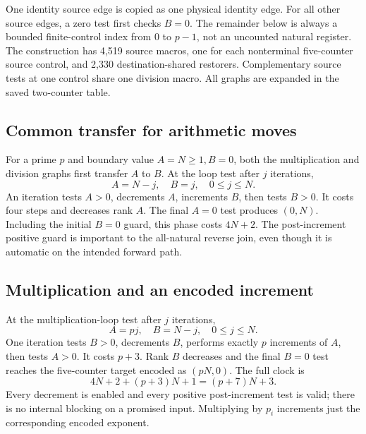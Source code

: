 \documentclass[11pt,a4paper]{article}
\numberwithin{equation}{section}
\begin{document}
One identity source edge is copied as one physical identity edge. For all
other source edges, a zero test first checks $B=0$. The remainder below is
always a bounded finite-control index from $0$ to $p-1$, not an uncounted
natural register. The construction has 4,519 source macros, one for each
nonterminal five-counter source control, and 2,330 destination-shared
restorers. Complementary source tests at one control share one division
macro. All graphs are expanded in the saved two-counter table.

\subsection{Common transfer for arithmetic moves}
For a prime $p$ and boundary value $A=N\ge1,B=0$, both the multiplication
and division graphs first transfer $A$ to $B$. At the loop test after $j$
iterations,
\[
                       A=N-j,\quad B=j,\quad0\le j\le N.\tag{13}
\]
An iteration tests $A>0$, decrements $A$, increments $B$, then tests $B>0$.
It costs four steps and decreases rank $A$. The final $A=0$ test produces
$(0,N)$. Including the initial $B=0$ guard, this phase costs $4N+2$.
The post-increment positive guard is important to the all-natural reverse
join, even though it is automatic on the intended forward path.

\subsection{Multiplication and an encoded increment}
At the multiplication-loop test after $j$ iterations,
\[
                        A=pj,\quad B=N-j,\quad0\le j\le N.\tag{14}
\]
One iteration tests $B>0$, decrements $B$, performs exactly $p$ increments
of $A$, then tests $A>0$. It costs $p+3$. Rank $B$ decreases and the final
$B=0$ test reaches the five-counter target encoded as $(pN,0)$. The full
clock is
\[
                  4N+2+(p+3)N+1=(p+7)N+3.             \tag{15}
\]
Every decrement is enabled and every positive post-increment test is valid;
there is no internal blocking on a promised input. Multiplying by $p_i$
increments just the corresponding encoded exponent.
\end{document}
